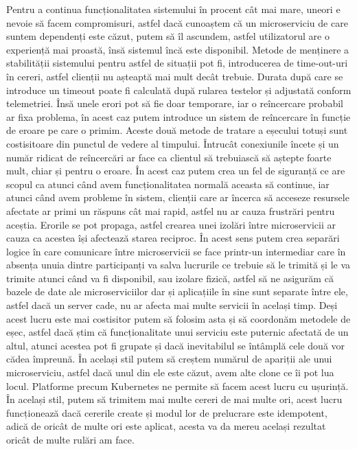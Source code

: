 Pentru a continua funcționalitatea sistemului în procent cât mai mare, uneori e nevoie
să facem compromisuri, astfel dacă cunoaștem că un microserviciu de care suntem
dependenți este căzut, putem să îl ascundem, astfel utilizatorul are o experiență mai proastă,
însă sistemul încă este disponibil. Metode de menținere a stabilității sistemului pentru
astfel de situații pot fi, introducerea de time-out-uri în cereri, astfel clienții nu așteaptă
mai mult decât trebuie. Durata după care se introduce un timeout poate fi calculată
după rularea testelor și adjustată conform telemetriei. Însă unele erori pot să fie
doar temporare, iar o reîncercare probabil ar fixa problema, în acest caz putem
introduce un sistem de reîncercare în funcție de eroare pe care o primim. Aceste două metode
de tratare a eșecului totuși sunt costisitoare din punctul de vedere al timpului. Întrucât
conexiunile încete și un număr ridicat de reîncercări ar face ca clientul să trebuiască
să aștepte foarte mult, chiar și pentru o eroare. În acest caz putem crea un fel de siguranță
ce are scopul ca atunci când avem funcționalitatea normală aceasta să continue, iar atunci
când avem probleme în sistem, clienții care ar încerca să acceseze resursele afectate ar primi
un răspuns cât mai rapid, astfel nu ar cauza frustrări pentru aceștia. Erorile se pot
propaga, astfel crearea unei izolări între microservicii ar cauza ca acestea își afectează
starea reciproc. În acest sens putem crea separări logice în care comunicare între microservicii
se face printr-un intermediar care în absența unuia dintre participanți va salva lucrurile
ce trebuie să le trimită și le va trimite atunci când va fi disponibil, sau izolare
fizică, astfel să ne asigurăm că bazele de date ale microserviciilor dar și aplicațiile în sine
sunt separate între ele, astfel dacă un server cade, nu ar afecta mai multe servicii în același timp.
Deși acest lucru este mai costisitor putem să folosim asta și să coordonăm metodele
de eșec, astfel dacă știm că funcționalitate unui serviciu este puternic afectată
de un altul, atunci acestea pot fi grupate și dacă inevitabilul se întâmplă cele două
vor cădea împreună. În același stil putem să creștem numărul de apariții ale unui microserviciu,
astfel dacă unul din ele este căzut, avem alte clone ce îi pot lua locul. Platforme precum
Kubernetes ne permite să facem acest lucru cu ușurință. În același stil, putem să trimitem
mai multe cereri de mai multe ori, acest lucru funcționează dacă cererile create și modul
lor de prelucrare este idempotent, adică de oricât de multe ori este aplicat, acesta
va da mereu același rezultat oricât de multe rulări am face.

